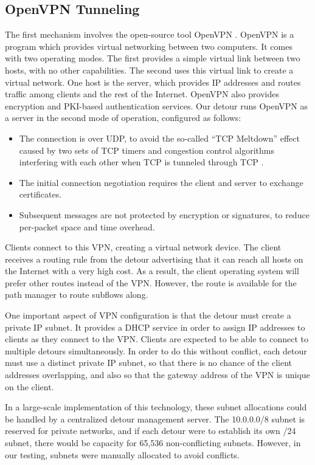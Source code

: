 \documentclass{cwru}
\begin{document}
\subsection{OpenVPN Tunneling}

The first mechanism involves the open-source tool OpenVPN
\cite{yonan2007openvpn}. OpenVPN is a program which provides virtual networking
between two computers. It comes with two operating modes. The first provides a
simple virtual link between two hosts, with no other capabilities. The second
uses this virtual link to create a virtual network. One host is the server,
which provides IP addresses and routes traffic among clients and the rest of the
Internet. OpenVPN also provides encryption and PKI-based authentication
services. Our detour runs OpenVPN as a server in the second mode of operation,
configured as follows:

\begin{itemize}
\item The connection is over UDP, to avoid the so-called ``TCP Meltdown'' effect
  caused by two sets of TCP timers and congestion control algorithms interfering
  with each other when TCP is tunneled through TCP \cite{khanvilkar2004virtual}.
\item The initial connection negotiation requires the client and server to
  exchange certificates.
\item Subsequent messages are not protected by encryption or signatures, to
  reduce per-packet space and time overhead.
\end{itemize}

Clients connect to this VPN, creating a virtual network device. The
client receives a routing rule from the detour advertising that it can reach all
hosts on the Internet with a very high cost. As a result, the client operating
system will prefer other routes instead of the VPN. However, the route is
available for the path manager to route subflows along.

One important aspect of VPN configuration is that the detour must create a
private IP subnet. It provides a DHCP service in order to assign IP addresses to
clients as they connect to the VPN. Clients are expected to be able to connect
to multiple detours simultaneously. In order to do this without conflict, each
detour must use a distinct private IP subnet, so that there is no chance of the
client addresses overlapping, and also so that the gateway address of the VPN is
unique on the client.

In a large-scale implementation of this technology, these subnet allocations
could be handled by a centralized detour management server. The 10.0.0.0/8
subnet is reserved for private networks, and if each detour were to establish
its own /24 subnet, there would be capacity for 65,536 non-conflicting subnets.
However, in our testing, subnets were manually allocated to avoid conflicts.
\end{document}
